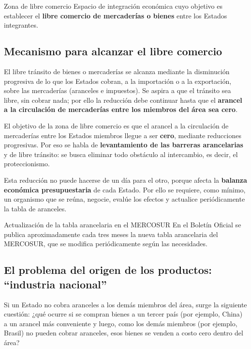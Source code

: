 \documentclass[12pt,oneside]{book}
\begin{document}
\begin{definition}{Zona de libre comercio}
Espacio de integración económica cuyo objetivo es establecer el \textbf{libre comercio de mercaderías o bienes} entre los Estados integrantes.
\end{definition}

\subsection{Mecanismo para alcanzar el libre comercio}

El libre tránsito de bienes o mercaderías se alcanza mediante la disminución progresiva de lo que los Estados cobran, a la importación o a la exportación, sobre las mercaderías (aranceles e impuestos). Se aspira a que el tránsito sea libre, sin cobrar nada; por ello la reducción debe continuar hasta que el \textbf{arancel a la circulación de mercaderías entre los miembros del área sea cero}.

\begin{important}
El objetivo de la zona de libre comercio es que el arancel a la circulación de mercaderías entre los Estados miembros llegue a ser \textbf{cero}, mediante reducciones progresivas. Por eso se habla de \textbf{levantamiento de las barreras arancelarias} y de libre tránsito: se busca eliminar todo obstáculo al intercambio, es decir, el proteccionismo.
\end{important}

Esta reducción no puede hacerse de un día para el otro, porque afecta la \textbf{balanza económica presupuestaria} de cada Estado. Por ello se requiere, como mínimo, un organismo que se reúna, negocie, evalúe los efectos y actualice periódicamente la tabla de aranceles.

\begin{example}{Actualización de la tabla arancelaria en el MERCOSUR}
En el Boletín Oficial se publica aproximadamente cada tres meses la nueva tabla arancelaria del MERCOSUR, que se modifica periódicamente según las necesidades.
\end{example}

\subsection{El problema del origen de los productos: ``industria nacional''}

Si un Estado no cobra aranceles a los demás miembros del área, surge la siguiente cuestión: ¿qué ocurre si se compran bienes a un tercer país (por ejemplo, China) a un arancel más conveniente y luego, como los demás miembros (por ejemplo, Brasil) no pueden cobrar aranceles, esos bienes se venden a costo cero dentro del área?
\end{document}
